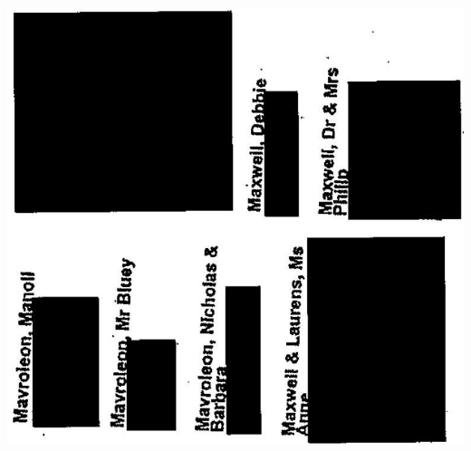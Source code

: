 \documentclass[10pt]{article}
\begin{document}
\includegraphics[max width=\textwidth, center]{2025_02_27_dd68c3d38de88f0516d9g-158}
\end{document}
